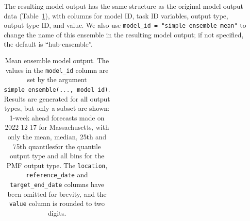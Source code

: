 \documentclass[
]{article}
\begin{document}
The resulting model output has the same structure as the original model
output data (Table~\ref{tbl-mean-ensemble}), with columns for model ID,
task ID variables, output type, output type ID, and value. We also use
\texttt{model\_id\ =\ "simple-ensemble-mean"} to change the name of this
ensemble in the resulting model output; if not specified, the default is
``hub-ensemble''.

\begin{longtable}[]{@{}
  >{\raggedright\arraybackslash}p{}
  >{\raggedright\arraybackslash}p{}
  >{\raggedleft\arraybackslash}p{}
  >{\raggedright\arraybackslash}p{}
  >{\raggedright\arraybackslash}p{}
  >{\raggedleft\arraybackslash}p{}@{}}

\caption{\label{tbl-mean-ensemble}Mean ensemble model output. The values
in the \texttt{model\_id} column are set by the argument
\texttt{simple\_ensemble(...,\ model\_id)}. Results are generated for
all output types, but only a subset are shown: 1-week ahead forecasts
made on 2022-12-17 for Massachusetts, with only the mean, median, 25th
and 75th quantilesfor the quantile output type and all bins for the PMF
output type. The \texttt{location}, \texttt{reference\_date} and
\texttt{target\_end\_date} columns have been omitted for brevity, and
the \texttt{value} column is rounded to two digits.}

\tabularnewline


\end{longtable}
\end{document}
